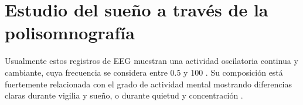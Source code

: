
\section{Estudio del sueño a través de la polisomnografía}

%
%
%

Usualmente estos registros de EEG muestran una actividad oscilatoria continua y cambiante, cuya
frecuencia se considera entre 0.5 y 100 \hz. Su composición está fuertemente relacionada con el 
grado de actividad mental mostrando diferencias claras durante vigilia y sueño, o durante quietud 
y concentración \cite{Clark98_2}.

